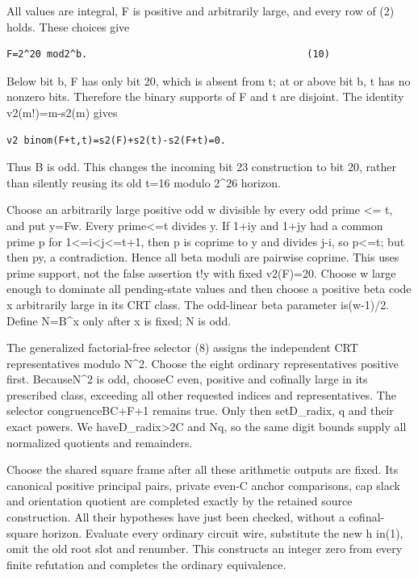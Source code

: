 All values are integral, F is positive and arbitrarily large, and every
row of (2) holds. These choices give

\begin{verbatim}
F=2^20 mod2^b.                                      (10)
\end{verbatim}

Below bit b, F has only bit 20, which is absent from t; at or above bit
b, t has no nonzero bits. Therefore the binary supports of F and t are
disjoint. The identity v2(m!)=m-s2(m) gives

\begin{verbatim}
v2 binom(F+t,t)=s2(F)+s2(t)-s2(F+t)=0.
\end{verbatim}

Thus B is odd. This changes the incoming bit 23 construction to bit 20,
rather than silently reusing its old t=16 modulo 2\^{}26 horizon.

Choose an arbitrarily large positive odd w divisible by every odd prime
\textless= t, and put y=Fw. Every prime\textless=t divides y. If 1+iy
and 1+jy had a common prime p for 1\textless=i\textless j\textless=t+1,
then p is coprime to y and divides j-i, so p\textless=t; but then
p\textbar y, a contradiction. Hence all beta moduli are pairwise
coprime. This uses prime support, not the false assertion t!\textbar y
with fixed v2(F)=20. Choose w large enough to dominate all pending-state
values and then choose a positive beta code x arbitrarily large in its
CRT class. The odd-linear beta parameter is(w-1)/2. Define N=B\^{}x only
after x is fixed; N is odd.

The generalized factorial-free selector (8) assigns the independent CRT
representatives modulo N\^{}2. Choose the eight ordinary representatives
positive first. BecauseN\^{}2 is odd, chooseC even, positive and
cofinally large in its prescribed class, exceeding all other requested
indices and representatives. The selector congruenceB\textbar C+F+1
remains true. Only then setD\_radix, q and their exact powers. We
haveD\_radix\textgreater2C and N\textbar q, so the same digit bounds
supply all normalized quotients and remainders.

Choose the shared square frame after all these arithmetic outputs are
fixed. Its canonical positive principal pairs, private even-C anchor
comparisons, cap slack and orientation quotient are completed exactly by
the retained source construction. All their hypotheses have just been
checked, without a cofinal-square horizon. Evaluate every ordinary
circuit wire, substitute the new h in(1), omit the old root slot and
renumber. This constructs an integer zero from every finite refutation
and completes the ordinary equivalence.

